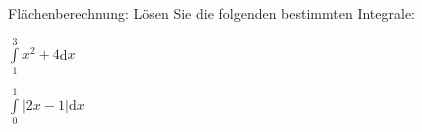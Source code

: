 \item Flächenberechnung: Lösen Sie die folgenden bestimmten Integrale:
\begin{enumerate}
\begin{multicols}{2}
\item $\int\limits_1^3 x^2+ 4 $d$x$
\item $\int\limits_0^1 |2x-1|$d$x$
\end{multicols}
\end{enumerate}

